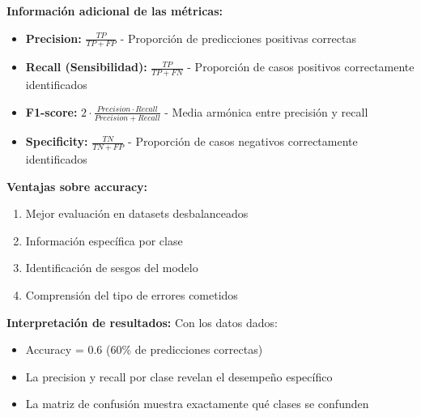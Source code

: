 \documentclass[12pt]{article}
\begin{document}
\textbf{Información adicional de las métricas:}

\begin{itemize}
    \item \textbf{Precision:} $\frac{TP}{TP + FP}$ - Proporción de predicciones positivas correctas
    \item \textbf{Recall (Sensibilidad):} $\frac{TP}{TP + FN}$ - Proporción de casos positivos correctamente identificados
    \item \textbf{F1-score:} $2 \cdot \frac{Precision \cdot Recall}{Precision + Recall}$ - Media armónica entre precisión y recall
    \item \textbf{Specificity:} $\frac{TN}{TN + FP}$ - Proporción de casos negativos correctamente identificados
\end{itemize}

\textbf{Ventajas sobre accuracy:}
\begin{enumerate}
    \item Mejor evaluación en datasets desbalanceados
    \item Información específica por clase
    \item Identificación de sesgos del modelo
    \item Comprensión del tipo de errores cometidos
\end{enumerate}

\textbf{Interpretación de resultados:}
Con los datos dados:
\begin{itemize}
    \item Accuracy = 0.6 (60\% de predicciones correctas)
    \item La precision y recall por clase revelan el desempeño específico
    \item La matriz de confusión muestra exactamente qué clases se confunden
\end{itemize}
\end{document}
